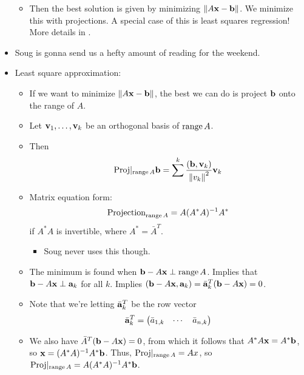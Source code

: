 \documentclass[../../notes.tex]{subfiles}
\begin{document}
\begin{itemize}
\begin{itemize}
        \item Then the best solution is given by minimizing $\norm{A\mathbf{x}-\mathbf{b}}$. We minimize this with projections. A special case of this is least squares regression! More details in \textcite{bib:Treil}.
    \end{itemize}
    \item {}Soug is gonna send us a hefty amount of reading for the weekend.
    \item Least square approximation:
    \begin{itemize}
        \item If we want to minimize $\norm{A\mathbf{x}-\mathbf{b}}$, the best we can do is project $\mathbf{b}$ onto the range of $A$.
        \item Let $\mathbf{v}_1,\dots,\mathbf{v}_k$ be an orthogonal basis of $\operatorname{range} A$.
        \item Then
        \begin{equation*}
            \text{Proj}|_{\operatorname{range} A}\mathbf{b} = \sum^k\frac{(\mathbf{b},\mathbf{v}_k)}{\norm{v_k}^2}\mathbf{v}_k
        \end{equation*}
        \item Matrix equation form:
        \begin{equation*}
            \text{Projection}_{\operatorname{range} A} = A(A^*A)^{-1}A^*
        \end{equation*}
        if $A^*A$ is invertible, where $A^*=\bar{A}^T$.
        \begin{itemize}
            \item Soug never uses this though.
        \end{itemize}
        \item The minimum is found when $\mathbf{b}-A\mathbf{x}\perp\operatorname{range} A$. Implies that $\mathbf{b}-A\mathbf{x}\perp\mathbf{a}_k$ for all $k$. Implies $(\mathbf{b}-A\mathbf{x},\mathbf{a}_k)={\bar{\mathbf{a}}_k}^T(\mathbf{b}-A\mathbf{x})=0$.
        \item Note that we're letting $\bar{\mathbf{a}}_k^T$ be the row vector
        \begin{equation*}
            \bar{\mathbf{a}}_k^T =
            \begin{pmatrix}
                \bar{a}_{1,k} & \cdots & \bar{a}_{n,k}
            \end{pmatrix}
        \end{equation*}
        \item We also have $\bar{A}^T(\mathbf{b}-A\mathbf{x})=0$, from which it follows that $A^*A\mathbf{x}=A^*\mathbf{b}$, so $\mathbf{x}=(A^*A)^{-1}A^*\mathbf{b}$. Thus, $\text{Proj}|_{\operatorname{range} A}=Ax$, so $\text{Proj}|_{\operatorname{range} A}=A(A^*A)^{-1}A^*\mathbf{b}$.
    \end{itemize}

\end{itemize}
\end{document}
